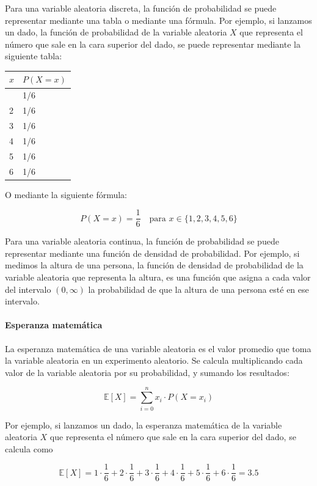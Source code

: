 Para una variable aleatoria discreta, la función de probabilidad se
puede representar mediante una tabla o mediante una fórmula. Por
ejemplo, si lanzamos un dado, la función de probabilidad de la variable
aleatoria \(X\) que representa el número que sale en la cara superior
del dado, se puede representar mediante la siguiente tabla:

\begin{longtable}[]{@{}ll@{}}
\toprule\noalign{}
\(x\) & \(P(X=x)\) \\
\midrule\noalign{}
\endhead
\bottomrule\noalign{}
\endlastfoot
1 & 1/6 \\
2 & 1/6 \\
3 & 1/6 \\
4 & 1/6 \\
5 & 1/6 \\
6 & 1/6 \\
\end{longtable}

O mediante la siguiente fórmula:

\[
P(X=x) = \frac{1}{6} \quad \text{para } x \in \{1,2,3,4,5,6\}
\]

Para una variable aleatoria continua, la función de probabilidad se
puede representar mediante una función de densidad de probabilidad. Por
ejemplo, si medimos la altura de una persona, la función de densidad de
probabilidad de la variable aleatoria que representa la altura, es una
función que asigna a cada valor del intervalo \((0,\infty)\) la
probabilidad de que la altura de una persona esté en ese intervalo.

\paragraph{Esperanza matemática}\label{esperanza-matemuxe1tica}

La esperanza matemática de una variable aleatoria es el valor promedio
que toma la variable aleatoria en un experimento aleatorio. Se calcula
multiplicando cada valor de la variable aleatoria por su probabilidad, y
sumando los resultados:

\[
\mathbb{E}[X] = \sum_{i=0}^n x_i \cdot P(X=x_i)
\]

Por ejemplo, si lanzamos un dado, la esperanza matemática de la variable
aleatoria \(X\) que representa el número que sale en la cara superior
del dado, se calcula como

\[
\mathbb{E}[X] = 1 \cdot \frac{1}{6} + 2 \cdot \frac{1}{6} + 3 \cdot \frac{1}{6} + 4 \cdot \frac{1}{6} + 5 \cdot \frac{1}{6} + 6 \cdot \frac{1}{6} = 3.5
\]

